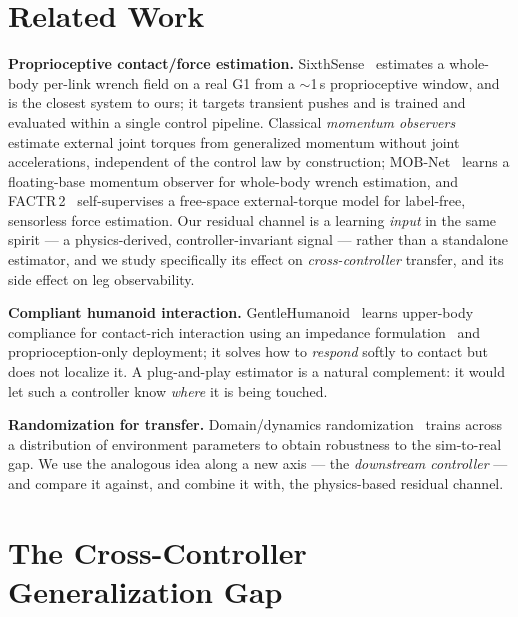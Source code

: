 \documentclass[conference]{IEEEtran}
\begin{document}
\section{Related Work}
\textbf{Proprioceptive contact/force estimation.} SixthSense~\cite{sixthsense}
estimates a whole-body per-link wrench field on a real G1 from a $\sim$1\,s
proprioceptive window, and is the closest system to ours; it targets transient
pushes and is trained and evaluated within a single control pipeline. Classical
\emph{momentum observers}~\cite{deluca2006momentum} estimate external joint
torques from generalized momentum without joint accelerations, independent of the
control law by construction; MOB-Net~\cite{mobnet} learns a floating-base
momentum observer for whole-body wrench estimation, and FACTR\,2~\cite{factr2}
self-supervises a free-space external-torque model for label-free, sensorless
force estimation.
Our residual channel is a learning \emph{input} in the same spirit --- a
physics-derived, controller-invariant signal --- rather than a standalone
estimator, and we study specifically its effect on \emph{cross-controller}
transfer, and its side effect on leg observability.

\textbf{Compliant humanoid interaction.} GentleHumanoid~\cite{gentlehumanoid}
learns upper-body compliance for contact-rich interaction using an impedance
formulation~\cite{hogan1985impedance} and proprioception-only deployment; it
solves how to \emph{respond} softly to contact but does not localize it. A
plug-and-play estimator is a natural complement: it would let such a controller
know \emph{where} it is being touched.

\textbf{Randomization for transfer.} Domain/dynamics
randomization~\cite{tobin2017domainrand} trains across a distribution of
environment parameters to obtain robustness to the sim-to-real gap. We use the
analogous idea along a new axis --- the \emph{downstream controller} --- and
compare it against, and combine it with, the physics-based residual channel.

\section{The Cross-Controller Generalization Gap}
\label{sec:gap}
\end{document}
